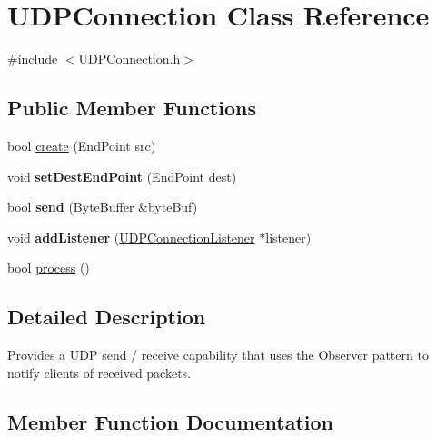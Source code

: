 \hypertarget{class_u_d_p_connection}{}\section{U\+D\+P\+Connection Class Reference}
\label{class_u_d_p_connection}


{\ttfamily \#include $<$U\+D\+P\+Connection.\+h$>$}

\subsection*{Public Member Functions}
\begin{DoxyCompactItemize}
\item 
bool \hyperlink{class_u_d_p_connection_a4b88bfcbf80052d96043380aaa54d1bd}{create} (End\+Point src)
\item 
void {\bfseries set\+Dest\+End\+Point} (End\+Point dest)\hypertarget{class_u_d_p_connection_afa04a5fa5b4330ff733be3ddf16fc745}{}\label{class_u_d_p_connection_afa04a5fa5b4330ff733be3ddf16fc745}

\item 
bool {\bfseries send} (Byte\+Buffer \&byte\+Buf)\hypertarget{class_u_d_p_connection_acd6d39bbb5f0bdd7d9a12ca4e67cc9d7}{}\label{class_u_d_p_connection_acd6d39bbb5f0bdd7d9a12ca4e67cc9d7}

\item 
void {\bfseries add\+Listener} (\hyperlink{class_u_d_p_connection_listener}{U\+D\+P\+Connection\+Listener} $\ast$listener)\hypertarget{class_u_d_p_connection_a978351406ece440969695f3561b1a6be}{}\label{class_u_d_p_connection_a978351406ece440969695f3561b1a6be}

\item 
bool \hyperlink{class_u_d_p_connection_ac0de7cf60e55ac228cbf351533258e05}{process} ()
\end{DoxyCompactItemize}


\subsection{Detailed Description}
Provides a U\+DP send / receive capability that uses the Observer pattern to notify clients of received packets. 

\subsection{Member Function Documentation}
